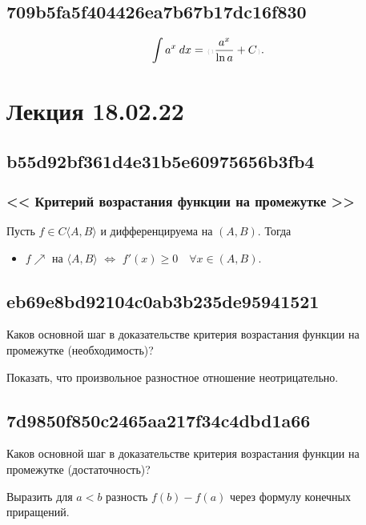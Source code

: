 \documentclass[11pt, a5paper]{article}
\let\oldsection\section
\renewcommand\section{\pagebreak\oldsection}
\newenvironment{note}[1]{\goodbreak\par\subsection{\hfill \color{lightgray}\tiny #1}}{}
\newenvironment{cloze}[2][\ldots]{\begin{leftbar}}{\end{leftbar}}
\newenvironment{icloze}[2][\ldots]{%
  \ignorespaces\text{\tiny \color{lightgray}\{#2} %
}{%
  \text{\tiny\color{lightgray}\}}\unskip%
}
\begin{document}
\begin{note}{709b5fa5f404426ea7b67b17dc16f830}
    \[
        \int a^{x} \: dx = \begin{icloze}{1}\frac{a^{x} }{\ln a} + C\end{icloze}.
    \]
\end{note}

\section{Лекция 18.02.22}
\begin{note}{b55d92bf361d4e31b5e60975656b3fb4}
    \subsubsection{<<\begin{icloze}{5}Критерий возрастания функции на промежутке\end{icloze}>>}
    Пусть \begin{icloze}{4}\( f \in C\langle A, B \rangle  \) и дифференцируема на \( (A, B) \).\end{icloze} Тогда
    \begin{itemize}
        \item {}\begin{icloze}{2}\( f \!\nearrow \) на \( \langle A, B \rangle  \)\end{icloze}
            \begin{icloze}{3}\( \iff  \)\end{icloze}
            \begin{icloze}{1}\( f'(x) \geqslant 0 \quad \forall x \in (A, B) \).\end{icloze}
    \end{itemize}
\end{note}

\begin{note}{eb69e8bd92104c0ab3b235de95941521}
    Каков основной шаг в доказательстве критерия возрастания функции на промежутке (необходимость)?

    \begin{cloze}{1}
        Показать, что произвольное разностное отношение неотрицательно.
    \end{cloze}
\end{note}

\begin{note}{7d9850f850c2465aa217f34c4dbd1a66}
    Каков основной шаг в доказательстве критерия возрастания функции на промежутке (достаточность)?

    \begin{cloze}{1}
        Выразить для \( a < b \) разность \( f(b) - f(a) \) через формулу конечных приращений.
    \end{cloze}
\end{note}
\end{document}

